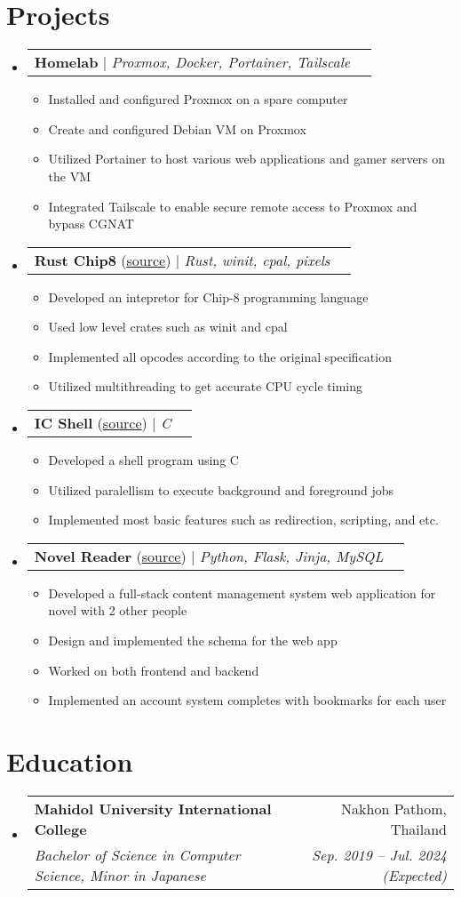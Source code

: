 \documentclass[letterpaper,11pt]{article}
\makeatletter
\newcommand{\resumeItem}[1]{
  \item\small{
    {#1 \vspace{-2pt}}
  }
}
\newcommand{\resumeSubheading}[4]{
  \vspace{-2pt}\item
    \begin{tabular*}{0.97\textwidth}[t]{l@{\extracolsep{\fill}}r}
      \textbf{#1} & #2 \\
      \textit{\small#3} & \textit{\small #4} \\
    \end{tabular*}\vspace{-7pt}
}
\newcommand{\resumeProjectHeading}[2]{
    \item
    \begin{tabular*}{0.97\textwidth}{l@{\extracolsep{\fill}}r}
      \small#1 & #2 \\
    \end{tabular*}\vspace{-7pt}
}
\newcommand{\resumeSubHeadingListStart}{\begin{itemize}[leftmargin=0.15in, label={}]}
\newcommand{\resumeSubHeadingListEnd}{\end{itemize}}
\newcommand{\resumeItemListStart}{\begin{itemize}}
\newcommand{\resumeItemListEnd}{\end{itemize}\vspace{-5pt}}
\makeatother
\begin{document}
\section{Projects}
    \resumeSubHeadingListStart
      \resumeProjectHeading
        {\textbf{Homelab} $|$ \emph{Proxmox, Docker, Portainer, Tailscale}}{}
        \resumeItemListStart
          \resumeItem{Installed and configured Proxmox on a spare computer}
          \resumeItem{Create and configured Debian VM on Proxmox}
          \resumeItem{Utilized Portainer to host various web applications and gamer servers on the VM }
          \resumeItem{Integrated Tailscale to enable secure remote access to Proxmox and bypass CGNAT}
        \resumeItemListEnd
      \resumeProjectHeading
        {\textbf{Rust Chip8} (\href{https://github.com/fordkuppp/rust-chip8}{\underline{source}}) $|$ \emph{Rust, winit, cpal, pixels}}{}
        \resumeItemListStart
          \resumeItem{Developed an intepretor for Chip-8 programming language}
          \resumeItem{Used low level crates such as winit and cpal}
          \resumeItem{Implemented all opcodes according to the original specification}
          \resumeItem{Utilized multithreading to get accurate CPU cycle timing}
        \resumeItemListEnd
      \resumeProjectHeading
        {\textbf{IC Shell} (\href{https://github.com/fordkuppp/icsh}{\underline{source}}) $|$ \emph{C}}{}
        \resumeItemListStart
          \resumeItem{Developed a shell program using C }
          \resumeItem{Utilized paralellism to execute background and foreground jobs }
          \resumeItem{Implemented most basic features such as redirection, scripting, and etc. }
        \resumeItemListEnd
      \resumeProjectHeading
        {\textbf{Novel Reader} (\href{https://github.com/fordkuppp/novel-reader}{\underline{source}}) $|$ \emph{Python, Flask, Jinja, MySQL}}{}
        \resumeItemListStart
          \resumeItem{Developed a full-stack content management system web application for novel with 2 other people}
          \resumeItem{Design and implemented the schema for the web app}
          \resumeItem{Worked on both frontend and backend}
          \resumeItem{Implemented an account system completes with bookmarks for each user}
        \resumeItemListEnd
    \resumeSubHeadingListEnd

\section{Education}
  \resumeSubHeadingListStart
    \resumeSubheading
      {Mahidol University International College}{Nakhon Pathom, Thailand}
      {Bachelor of Science in Computer Science, Minor in Japanese}{Sep. 2019 -- Jul. 2024 (Expected)}
  \resumeSubHeadingListEnd
\end{document}
